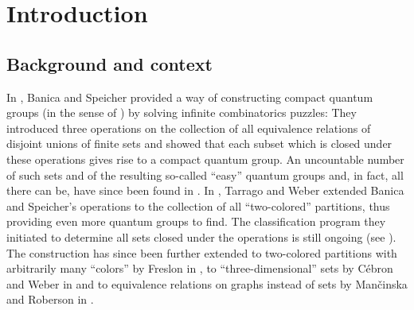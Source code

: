 \documentclass[pdftex]{sigma}
\numberwithin{equation}{section}
\begin{document}
\newcommand{\UCPartSingle}{%
  \begin{tikzpicture}[baseline=0.0cm]
    \def\xdist{0.2cm}
    \def\ydist{0.32cm}
    \def\ypar{0.25cm}
    \coordinate (a1) at ({0*\xdist},{0*\ydist});
    \draw[->] (a1) -- ++ (0,{\ypar});
  \end{tikzpicture}
}
\newcommand{\UCPartSinglesTensor}{%
  \begin{tikzpicture}[baseline=0.0cm]
    \def\xdist{0.2cm}
    \def\ydist{0.32cm}
    \def\ypar{0.25cm}
    \coordinate (a1) at ({0*\xdist},{0*\ydist});
    \coordinate (a2) at ({1.75*\xdist},{0*\ydist});
    \draw[->] (a1) -- ++ (0,{\ypar});
    \draw[->] (a2) -- ++ (0,{\ypar});
    \node [scale=0.66] at ($(a1)+({0.5*1.75*\xdist},{0.325*\ydist})$) {$\otimes$};
  \end{tikzpicture}
}
\newcommand{\UCPartSingles}{%
  \begin{tikzpicture}[baseline=0.0cm]
    \def\xdist{0.2cm}
    \def\ydist{0.32cm}
    \def\ypar{0.2cm}
    \coordinate (a1) at ({0*\xdist},{0*\ydist});
    \coordinate (a2) at ({1*\xdist},{0*\ydist});
    \draw[->] (a1) -- ++ (0,{\ypar});
    \draw[->] (a2) -- ++ (0,{\ypar});
  \end{tikzpicture}
}


\section{Introduction}
\label{section:introduction}

\subsection{Background and context}
\label{section:introduction-background-and-context}
In \cite{BanicaSpeicher2009}, Banica and Speicher provided a way of constructing compact quantum groups (in the sense of \cite{Woronowicz1987b, Woronowicz1991, Woronowicz1998}) by solving infinite combinatorics puzzles:  They introduced three operations on the collection of all equivalence relations of disjoint unions of finite sets and showed that each subset which is closed under these operations gives rise to a compact quantum group. An uncountable number of such sets and of the resulting so-called ``easy''  quantum groups and, in fact, all there can be, have since been found in \cite{BanicaCurranSpeicher2010,BanicaSpeicher2009, RaumWeber2014, RaumWeber2016a, RaumWeber2016b, Weber2013}. In \cite{TarragoWeber2018}, Tarrago and Weber extended Banica and Speicher's operations to the collection of all ``two-co\-lo\-red'' partitions, thus providing even more quantum groups to find. The classification program they initiated to determine all sets closed under the operations is still ongoing (see \cite{ Gromada2018,Maassen2021, Mang2022, MangWeber2020, MangWeber2021a, MangWeber2021b, MangWeber2021c, TarragoWeber2018}). The construction has since been further extended to two-co\-lo\-red partitions with arbitrarily many ``colors'' by Freslon in \cite{Freslon2017}, to ``three-dimensional'' sets  by C\'ebron and Weber in \cite{CebronWeber2016} and to  equivalence relations on graphs instead of sets by Man\v{c}inska and Roberson in \cite{MancinskaRoberson2020}.
\end{document}
